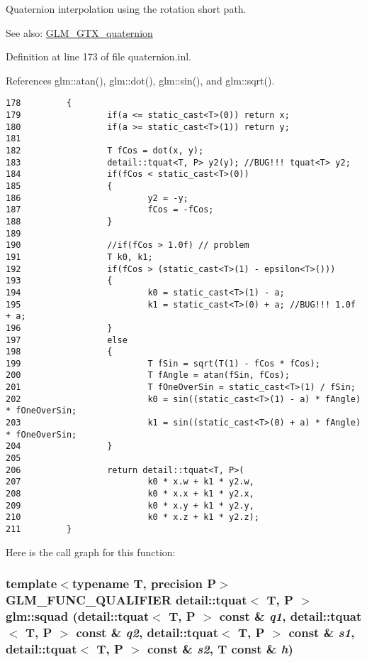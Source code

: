 Quaternion interpolation using the rotation short path.

\begin{Desc}
\item[See also:]\hyperlink{group__gtx__quaternion}{GLM\_\-GTX\_\-quaternion} \end{Desc}


Definition at line 173 of file quaternion.inl.

References glm::atan(), glm::dot(), glm::sin(), and glm::sqrt().

\begin{Code}\begin{verbatim}178         {
179                 if(a <= static_cast<T>(0)) return x;
180                 if(a >= static_cast<T>(1)) return y;
181 
182                 T fCos = dot(x, y);
183                 detail::tquat<T, P> y2(y); //BUG!!! tquat<T> y2;
184                 if(fCos < static_cast<T>(0))
185                 {
186                         y2 = -y;
187                         fCos = -fCos;
188                 }
189 
190                 //if(fCos > 1.0f) // problem
191                 T k0, k1;
192                 if(fCos > (static_cast<T>(1) - epsilon<T>()))
193                 {
194                         k0 = static_cast<T>(1) - a;
195                         k1 = static_cast<T>(0) + a; //BUG!!! 1.0f + a;
196                 }
197                 else
198                 {
199                         T fSin = sqrt(T(1) - fCos * fCos);
200                         T fAngle = atan(fSin, fCos);
201                         T fOneOverSin = static_cast<T>(1) / fSin;
202                         k0 = sin((static_cast<T>(1) - a) * fAngle) * fOneOverSin;
203                         k1 = sin((static_cast<T>(0) + a) * fAngle) * fOneOverSin;
204                 }
205 
206                 return detail::tquat<T, P>(
207                         k0 * x.w + k1 * y2.w,
208                         k0 * x.x + k1 * y2.x,
209                         k0 * x.y + k1 * y2.y,
210                         k0 * x.z + k1 * y2.z);
211         }
\end{verbatim}
\end{Code}




Here is the call graph for this function:\hypertarget{group__gtx__quaternion_g8ed8845077927e9b8fc7bd74872c161a}{
\subsubsection[squad]{\setlength{\rightskip}{0pt plus 5cm}template$<$typename T, precision P$>$ GLM\_\-FUNC\_\-QUALIFIER detail::tquat$<$ T, P $>$ glm::squad (detail::tquat$<$ T, P $>$ const \& {\em q1}, \/  detail::tquat$<$ T, P $>$ const \& {\em q2}, \/  detail::tquat$<$ T, P $>$ const \& {\em s1}, \/  detail::tquat$<$ T, P $>$ const \& {\em s2}, \/  T const \& {\em h})}}
\label{group__gtx__quaternion_g8ed8845077927e9b8fc7bd74872c161a}


